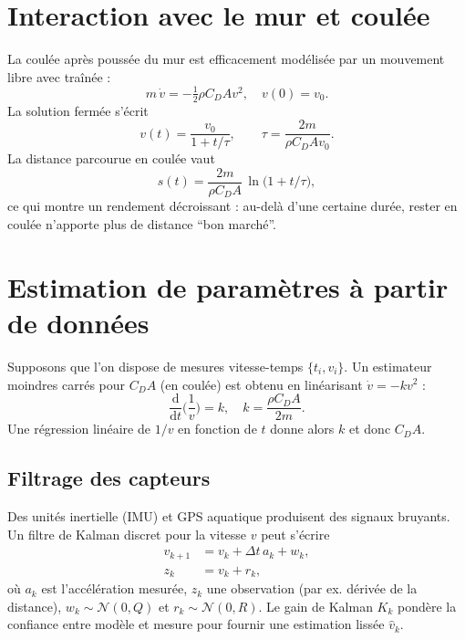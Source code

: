 \documentclass[12pt,a4paper]{article}
\newcommand{\dd}{\mathrm{d}}
\begin{document}
\section{Interaction avec le mur et coulée}
La coulée après poussée du mur est efficacement modélisée par un mouvement libre avec traînée :
\begin{equation}
 m\,\dot v = - \tfrac{1}{2}\rho C_D A v^2, \quad v(0)=v_0.
 \end{equation}
La solution fermée s'écrit
\begin{equation}
 v(t) = \frac{v_0}{1+ t/\tau}, \qquad \tau = \frac{2m}{\rho C_D A v_0}.
 \end{equation}
La distance parcourue en coulée vaut
\begin{equation}
 s(t) = \frac{2m}{\rho C_D A}\,\ln\big(1+t/\tau\big),
 \end{equation}
ce qui montre un rendement décroissant : au-delà d'une certaine durée, rester en coulée n'apporte plus de distance ``bon marché''.

\section{Estimation de paramètres à partir de données}
Supposons que l'on dispose de mesures vitesse-temps $\{t_i,v_i\}$. Un estimateur moindres carrés pour $C_D A$ (en coulée) est obtenu en linéarisant $\dot v = -k v^2$ :
\begin{equation}
 \frac{\dd}{\dd t}\Big(\frac{1}{v}\Big) = k, \quad k=\frac{\rho C_D A}{2m}.
 \end{equation}
Une régression linéaire de $1/v$ en fonction de $t$ donne alors $k$ et donc $C_D A$.

\subsection{Filtrage des capteurs}
Des unités inertielle (IMU) et GPS aquatique produisent des signaux bruyants. Un filtre de Kalman discret pour la vitesse $v$ peut s'écrire
\begin{align}
 v_{k+1} &= v_k + \Delta t\,a_k + w_k, \\
 z_k &= v_k + r_k,
 \end{align}
où $a_k$ est l'accélération mesurée, $z_k$ une observation (par ex. dérivée de la distance), $w_k\sim\mathcal{N}(0,Q)$ et $r_k\sim\mathcal{N}(0,R)$. Le gain de Kalman $K_k$ pondère la confiance entre modèle et mesure pour fournir une estimation lissée $\hat v_k$.
\end{document}
